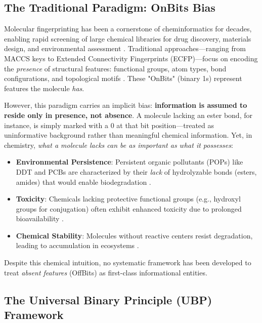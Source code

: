 \documentclass[11pt,letterpaper]{article}
\begin{document}
\subsection{The Traditional Paradigm: OnBits Bias}

Molecular fingerprinting has been a cornerstone of cheminformatics for decades, enabling rapid screening of large chemical libraries for drug discovery, materials design, and environmental assessment \cite{cereto2015molecular, muegge2016overview}. Traditional approaches—ranging from MACCS keys to Extended Connectivity Fingerprints (ECFP)—focus on encoding the \textit{presence} of structural features: functional groups, atom types, bond configurations, and topological motifs \cite{Rogers2010}. These "OnBits" (binary 1s) represent features the molecule \textit{has}.

However, this paradigm carries an implicit bias: \textbf{information is assumed to reside only in presence, not absence}. A molecule lacking an ester bond, for instance, is simply marked with a 0 at that bit position—treated as uninformative background rather than meaningful chemical information. Yet, in chemistry, \textit{what a molecule lacks can be as important as what it possesses}:

\begin{itemize}
    \item \textbf{Environmental Persistence}: Persistent organic pollutants (POPs) like DDT and PCBs are characterized by their \textit{lack} of hydrolyzable bonds (esters, amides) that would enable biodegradation \cite{breivik2004towards, jones1999persistent}.
    \item \textbf{Toxicity}: Chemicals lacking protective functional groups (e.g., hydroxyl groups for conjugation) often exhibit enhanced toxicity due to prolonged bioavailability \cite{parkinson2015biotransformation}.
    \item \textbf{Chemical Stability}: Molecules without reactive centers resist degradation, leading to accumulation in ecosystems \cite{schwarzenbach2003challenge}.
\end{itemize}

Despite this chemical intuition, no systematic framework has been developed to treat \textit{absent features} (OffBits) as first-class informational entities.

\subsection{The Universal Binary Principle (UBP) Framework}
\end{document}
